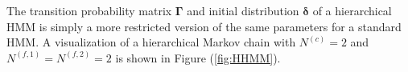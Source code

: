 %
%
%
The transition probability matrix $\boldsymbol{\Gamma}$ and initial distribution $\boldsymbol{\delta}$ of a hierarchical HMM is simply a more restricted version of the same parameters for a standard HMM. A visualization of a hierarchical Markov chain with $N^{(c)} = 2$ and $N^{(f,1)} = N^{(f,2)} = 2$ is shown in Figure (\ref{fig:HHMM}).
%

